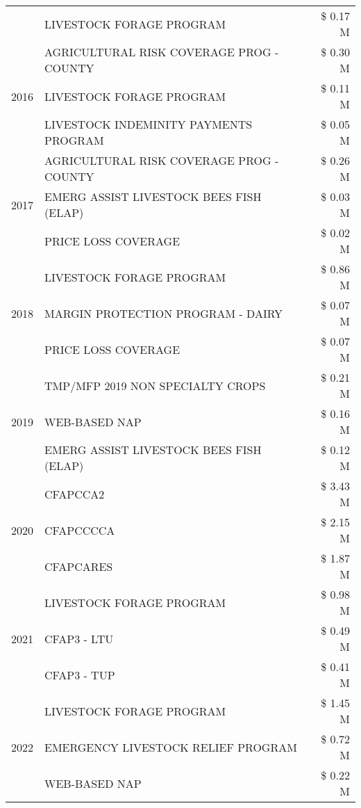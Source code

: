 \begin{tabular}{llr}
 & LIVESTOCK FORAGE PROGRAM & \$ 0.17 M \\
\cline{1-3}
\multirow[t]{3}{*}{2016} & AGRICULTURAL RISK COVERAGE PROG - COUNTY & \$ 0.30 M \\
 & LIVESTOCK FORAGE PROGRAM & \$ 0.11 M \\
 & LIVESTOCK INDEMINITY PAYMENTS PROGRAM & \$ 0.05 M \\
\cline{1-3}
\multirow[t]{3}{*}{2017} & AGRICULTURAL RISK COVERAGE PROG - COUNTY & \$ 0.26 M \\
 & EMERG ASSIST LIVESTOCK BEES FISH (ELAP) & \$ 0.03 M \\
 & PRICE LOSS COVERAGE & \$ 0.02 M \\
\cline{1-3}
\multirow[t]{3}{*}{2018} & LIVESTOCK FORAGE PROGRAM & \$ 0.86 M \\
 & MARGIN PROTECTION PROGRAM - DAIRY & \$ 0.07 M \\
 & PRICE LOSS COVERAGE & \$ 0.07 M \\
\cline{1-3}
\multirow[t]{3}{*}{2019} & TMP/MFP 2019 NON SPECIALTY CROPS & \$ 0.21 M \\
 & WEB-BASED NAP & \$ 0.16 M \\
 & EMERG ASSIST LIVESTOCK BEES FISH (ELAP) & \$ 0.12 M \\
\cline{1-3}
\multirow[t]{3}{*}{2020} & CFAPCCA2 & \$ 3.43 M \\
 & CFAPCCCCA & \$ 2.15 M \\
 & CFAPCARES & \$ 1.87 M \\
\cline{1-3}
\multirow[t]{3}{*}{2021} & LIVESTOCK FORAGE PROGRAM & \$ 0.98 M \\
 & CFAP3 - LTU & \$ 0.49 M \\
 & CFAP3 - TUP & \$ 0.41 M \\
\cline{1-3}
\multirow[t]{3}{*}{2022} & LIVESTOCK FORAGE PROGRAM & \$ 1.45 M \\
 & EMERGENCY LIVESTOCK RELIEF PROGRAM & \$ 0.72 M \\
 & WEB-BASED NAP & \$ 0.22 M \\
\cline{1-3}
\bottomrule
\end{tabular}
